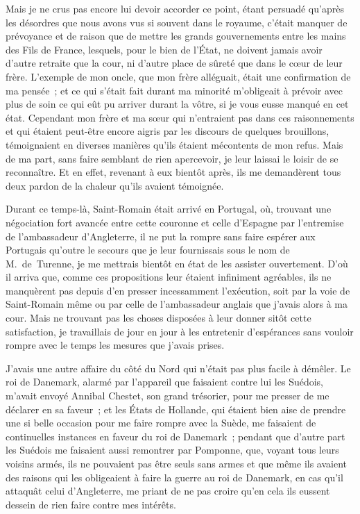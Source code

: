 \documentclass[french,twoside]{book} %
\begin{document}
Mais je ne crus pas encore lui devoir accorder ce point, étant persuadé qu’après les désordres que nous avons vus si souvent dans le royaume, c’était manquer de prévoyance et de raison que de mettre les grands gouvernements entre les mains des Fils de France, lesquels, pour le bien de l’État, ne doivent jamais avoir d’autre retraite que la cour, ni d’autre place de sûreté que dans le cœur de leur frère. L’exemple de mon oncle, que mon frère alléguait, était une confirmation de ma pensée ; et ce qui s’était fait durant ma minorité m’obligeait à prévoir avec plus de soin ce qui eût pu arriver durant la vôtre, si je vous eusse manqué en cet état. Cependant mon frère et ma sœur qui n’entraient pas dans ces raisonnements et qui étaient peut-être encore aigris par les discours de quelques brouillons, témoignaient en diverses manières qu’ils étaient mécontents de mon refus. Mais de ma part, sans faire semblant de rien apercevoir, je leur laissai le loisir de se reconnaître. Et en effet, revenant à eux bientôt après, ils me demandèrent tous deux pardon de la chaleur qu’ils avaient témoignée.\par
Durant ce temps-là, Saint-Romain était arrivé en Portugal, où, trouvant une négociation fort avancée entre cette couronne et celle d’Espagne par l’entremise de l’ambassadeur d’Angleterre, il ne put la rompre sans faire espérer aux Portugais qu’outre le secours que je leur fournissais sous le nom de M. de Turenne, je me mettrais bientôt en état de les assister ouvertement. D’où il arriva que, comme ces propositions leur étaient infiniment agréables, ils ne manquèrent pas depuis d’en presser incessamment l’exécution, soit par la voie de Saint-Romain même ou par celle de l’ambassadeur anglais que j’avais alors à ma cour. Mais ne trouvant pas les choses disposées à leur donner sitôt cette satisfaction, je travaillais de jour en jour à les entretenir d’espérances sans vouloir rompre avec le temps les mesures que j’avais prises.\par
J’avais une autre affaire du côté du Nord qui n’était pas plus facile à démêler. Le roi de Danemark, alarmé par l’appareil que faisaient contre lui les Suédois, m’avait envoyé Annibal Chestet, son grand trésorier, pour me presser de me déclarer en sa faveur ; et les États de Hollande, qui étaient bien aise de prendre une si belle occasion pour me faire rompre avec la Suède, me faisaient de continuelles instances en faveur du roi de Danemark ; pendant que d’autre part les Suédois me faisaient aussi remontrer par Pomponne, que, voyant tous leurs voisins armés, ils ne pouvaient pas être seuls sans armes et que même ils avaient des raisons qui les obligeaient à faire la guerre au roi de Danemark, en cas qu’il attaquât celui d’Angleterre, me priant de ne pas croire qu’en cela ils eussent dessein de rien faire contre mes intérêts.\par
\end{document}
